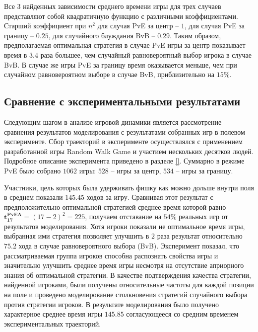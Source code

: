 Все 3 найденных зависимости среднего времени игры для трех случаев представляют собой квадратичную функцию с различными коэффициентами.
Старший коэффициент при $n^2$ для случая PvE за центр -- $1$, для случая PvE за границу -- $0.25$, для случайного блуждания BvB -- $0.29$.
Таким образом, предполагаемая оптимальная стратегия в случае PvE игры за центр показывает время в $3.4$ раза большее, чем случайный равновероятный выбор игрока в случае BvB.
В случае же игры PvE за границу время оказывается меньше, чем при случайном равновероятном выборе в случае BvB, приблизительно на $15\%$.


\subsection{Сравнение с экспериментальными результатами}\label{subsec:ch3/sec1/sub1}

Следующим шагом в анализе игровой динамики является рассмотрение сравнения результатов моделирования с результатами 
собранных игр в полевом эксперименте. Сбор траекторий в эксперименте осуществлялся с применением разработанной игры Random Walk Game
и участием нескольких десятков людей. Подробное описание эксперимента приведено в разделе \cref{}. Суммарно в режиме 
PvE было собрано $1062$ игры: $528$ -- игры за центр, $534$ -- игры за границу. 

Участники, цель которых была удерживать фишку как можно
дольше внутри поля в среднем показали $145.45$ ходов за игру. Сравнивая этот результат с предположительно оптимальной стратегией 
среднее время которой равно $\boldsymbol{t_{17}^{PvE A}} = (17-2)^2 = 225$, получаем отставание на $54\%$ реальных игр от результатов моделирования.
Хотя игроки показали не оптимальное время игры, выбранная ими стратегия позволяет улучшить в $2$ раза результат относительно $75.2$ хода
в случае равновероятного выбора (BvB). Эксперимент показал, что рассматриваемая группа игроков способна распознать свойства игры 
и значительно улучшить среднее время игры несмотря на отсутствие априорного знания об оптимальной стратегии. 
В качестве подтверждения качества стратегии, найденной игроками, были получены относительные частоты для каждой позиции на поле
и проведено моделирование столкновения стратегий случайного выбора против стратегии игроков. В результате моделирования было получено 
характерное среднее время игры $145.85$ согласующееся со средним временем экспериментальных траекторий.

